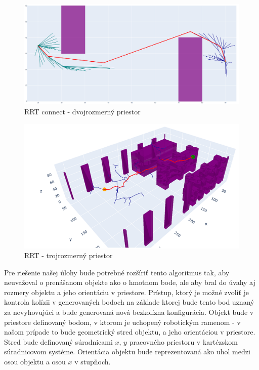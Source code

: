 \begin{figure}[]
	\centering
	\includegraphics[width=140mm]{img/RRTconnect-2D.png}
	\caption{RRT connect - dvojrozmerný priestor} \label{OBRAZOK 3.3} 
\end{figure} 

\begin{figure}[]
	\centering
	\includegraphics[width=140mm]{img/RRT-3D.png}
	\caption{RRT - trojrozmerný priestor} \label{OBRAZOK 3.4} 
\end{figure} 


Pre riešenie našej úlohy bude potrebné rozšíriť tento algoritmus tak, aby neuvažoval o prenášanom objekte ako o hmotnom bode, ale aby bral do úvahy aj rozmery objektu a jeho orientáciu v priestore. Prístup, ktorý je možné zvoliť je kontrola kolízii v generovaných bodoch na základe ktorej bude tento bod uznaný za nevyhovujúci a bude generovaná nová bezkolízna konfigurácia. Objekt bude v priestore definovaný bodom, v ktorom je uchopený robotickým ramenom - v našom prípade to bude geometrický stred objektu, a jeho orientáciou v priestore.  Stred bude definovaný súradnicami $ x $, $ y $ pracovného priestoru v kartézskom súradnicovom systéme. Orientácia objektu bude reprezentovaná ako uhol medzi osou objektu a osou  $x$ v stupňoch.

